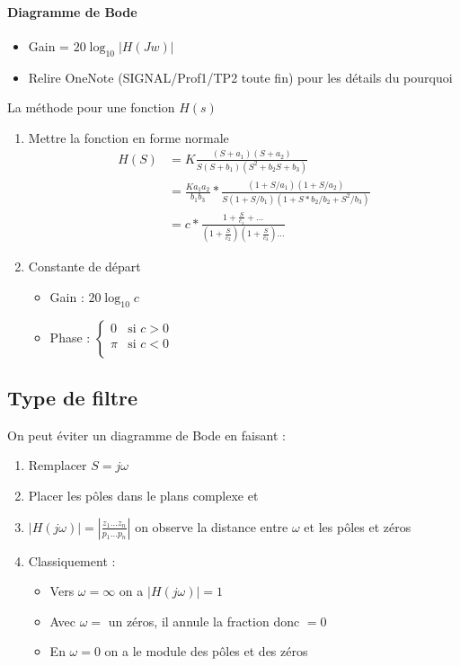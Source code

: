 \documentclass[9pt]{article}
\begin{document}
\begin{multicols}{3}
\paragraph*{Diagramme de Bode}
\begin{itemize}
    \item Gain = $ 20 \log_{10} \left| H(Jw) \right| $
    \item Relire OneNote (SIGNAL/Prof1/TP2 toute fin) pour les détails du pourquoi 
\end{itemize}
La méthode pour une fonction $ H(s) $ 
\begin{enumerate}
    \item Mettre la fonction en forme normale 
    \begin{align*}
        H(S) &= K \frac{(S + a_1)(S+a_2)}{S(S+b_1)(S^2 + b_2 S + b_3)} \\
            &= \frac{K a_1 a_2}{b_1 b_3} * \frac{(1 + S/a_1)(1+S/a_2)}{S(1+S/b_1)(1 + S*b_2/b_2 + S^2/b_3)} \\ 
            &= c * \frac{1 + \frac{S}{c_1} + \dots}{(1 + \frac{S}{c_2})(1 + \frac{S}{c_3})\dots}
    \end{align*}
    \item Constante de départ \begin{itemize}
        \item Gain : $ 20 \log_{10} c $ 
        \item Phase : $ \begin{cases}
        0 &\text{si } c>0 \\
        \pi  &\text{si }c < 0 \\
        \end{cases}  $ 
    \end{itemize} 

\end{enumerate}

\subsection{Type de filtre}
On peut éviter un diagramme de Bode en faisant : 
\begin{enumerate}
    \item Remplacer $ S=j \omega  $ 
    \item Placer les pôles dans le plans complexe et 
    \item $ \left| H(j \omega ) \right| = \left| \frac{z_1\dots z_n}{p_1 \dots p_n} \right|  $ on observe la distance entre $ \omega $ et les pôles et zéros
    \item Classiquement : \begin{itemize}
        \item Vers $ \omega = \infty  $ on a $ \left| H(j \omega ) \right| = 1 $ 
        \item Avec $ \omega =  $ un zéros, il annule la fraction donc $ = 0 $ 
        \item En $ \omega = 0 $ on a le module des pôles et des zéros
    \end{itemize}
\end{enumerate}


\end{multicols}
\end{document}

